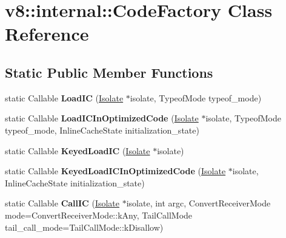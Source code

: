 \hypertarget{classv8_1_1internal_1_1_code_factory}{}\section{v8\+:\+:internal\+:\+:Code\+Factory Class Reference}
\label{classv8_1_1internal_1_1_code_factory}
\subsection*{Static Public Member Functions}
\begin{DoxyCompactItemize}
\item 
static Callable {\bfseries Load\+IC} (\hyperlink{classv8_1_1internal_1_1_isolate}{Isolate} $\ast$isolate, Typeof\+Mode typeof\+\_\+mode)\hypertarget{classv8_1_1internal_1_1_code_factory_afd4143fa9614f9965bc1a0c8c5a26d3a}{}\label{classv8_1_1internal_1_1_code_factory_afd4143fa9614f9965bc1a0c8c5a26d3a}

\item 
static Callable {\bfseries Load\+I\+C\+In\+Optimized\+Code} (\hyperlink{classv8_1_1internal_1_1_isolate}{Isolate} $\ast$isolate, Typeof\+Mode typeof\+\_\+mode, Inline\+Cache\+State initialization\+\_\+state)\hypertarget{classv8_1_1internal_1_1_code_factory_a6149cbd047fe51dd2598fdbaedf23ef2}{}\label{classv8_1_1internal_1_1_code_factory_a6149cbd047fe51dd2598fdbaedf23ef2}

\item 
static Callable {\bfseries Keyed\+Load\+IC} (\hyperlink{classv8_1_1internal_1_1_isolate}{Isolate} $\ast$isolate)\hypertarget{classv8_1_1internal_1_1_code_factory_a0512a5aa92ec617b58e5e0b872122160}{}\label{classv8_1_1internal_1_1_code_factory_a0512a5aa92ec617b58e5e0b872122160}

\item 
static Callable {\bfseries Keyed\+Load\+I\+C\+In\+Optimized\+Code} (\hyperlink{classv8_1_1internal_1_1_isolate}{Isolate} $\ast$isolate, Inline\+Cache\+State initialization\+\_\+state)\hypertarget{classv8_1_1internal_1_1_code_factory_ab7da8fb356028454387dfea662debc43}{}\label{classv8_1_1internal_1_1_code_factory_ab7da8fb356028454387dfea662debc43}

\item 
static Callable {\bfseries Call\+IC} (\hyperlink{classv8_1_1internal_1_1_isolate}{Isolate} $\ast$isolate, int argc, Convert\+Receiver\+Mode mode=Convert\+Receiver\+Mode\+::k\+Any, Tail\+Call\+Mode tail\+\_\+call\+\_\+mode=Tail\+Call\+Mode\+::k\+Disallow)\hypertarget{classv8_1_1internal_1_1_code_factory_aae18d2ce2ac9536cef8fc549e22bed80}{}\label{classv8_1_1internal_1_1_code_factory_aae18d2ce2ac9536cef8fc549e22bed80}


\end{DoxyCompactItemize}
